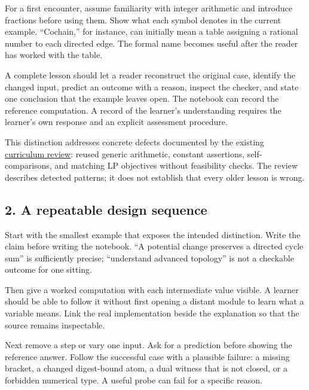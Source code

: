 \documentclass[
  11pt,
]{article}
\begin{document}
For a first encounter, assume familiarity with integer arithmetic and
introduce fractions before using them. Show what each symbol denotes in
the current example. ``Cochain,'' for instance, can initially mean a
table assigning a rational number to each directed edge. The formal name
becomes useful after the reader has worked with the table.

A complete lesson should let a reader reconstruct the original case,
identify the changed input, predict an outcome with a reason, inspect
the checker, and state one conclusion that the example leaves open. The
notebook can record the reference computation. A record of the learner's
understanding requires the learner's own response and an explicit
assessment procedure.

This distinction addresses concrete defects documented by the existing
\href{https://github.com/dbccpage/the_symbol_game/blob/52cb5457f6c485ba548cfd292f6012a941ed22cf/education/the_symbol_game/lessons/system_integration/curriculum_125_review.md}{curriculum
review}: reused generic arithmetic, constant assertions,
self-comparisons, and matching LP objectives without feasibility checks.
The review describes detected patterns; it does not establish that every
older lesson is wrong.

\hypertarget{a-repeatable-design-sequence}{%
\subsection{2. A repeatable design
sequence}\label{a-repeatable-design-sequence}}

Start with the smallest example that exposes the intended distinction.
Write the claim before writing the notebook. ``A potential change
preserves a directed cycle sum'' is sufficiently precise; ``understand
advanced topology'' is not a checkable outcome for one sitting.

Then give a worked computation with each intermediate value visible. A
learner should be able to follow it without first opening a distant
module to learn what a variable means. Link the real implementation
beside the explanation so that the source remains inspectable.

Next remove a step or vary one input. Ask for a prediction before
showing the reference answer. Follow the successful case with a
plausible failure: a missing bracket, a changed digest-bound atom, a
dual witness that is not closed, or a forbidden numerical type. A useful
probe can fail for a specific reason.
\end{document}
